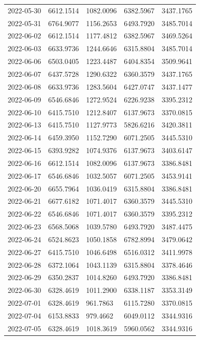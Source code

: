 \begin{footnotesize}
\begin{longtable}{lllll}
2022-05-30 & 6612.1514 & 1082.0096 & 6382.5967 & 3437.1765 \\
2022-05-31 & 6764.9077 & 1156.2653 & 6493.7920 & 3485.7014 \\
2022-06-02 & 6612.1514 & 1177.4812 & 6382.5967 & 3469.5264 \\
2022-06-03 & 6633.9736 & 1244.6646 & 6315.8804 & 3485.7014 \\
2022-06-06 & 6503.0405 & 1223.4487 & 6404.8354 & 3509.9641 \\
2022-06-07 & 6437.5728 & 1290.6322 & 6360.3579 & 3437.1765 \\
2022-06-08 & 6633.9736 & 1283.5604 & 6427.0747 & 3437.1477 \\
2022-06-09 & 6546.6846 & 1272.9524 & 6226.9238 & 3395.2312 \\
2022-06-10 & 6415.7510 & 1212.8407 & 6137.9673 & 3370.0815 \\
2022-06-13 & 6415.7510 & 1127.9773 & 5826.6216 & 3420.3811 \\
2022-06-14 & 6459.3950 & 1152.7290 & 6071.2505 & 3445.5310 \\
2022-06-15 & 6393.9282 & 1074.9376 & 6137.9673 & 3403.6147 \\
2022-06-16 & 6612.1514 & 1082.0096 & 6137.9673 & 3386.8481 \\
2022-06-17 & 6546.6846 & 1032.5057 & 6071.2505 & 3453.9141 \\
2022-06-20 & 6655.7964 & 1036.0419 & 6315.8804 & 3386.8481 \\
2022-06-21 & 6677.6182 & 1071.4017 & 6360.3579 & 3445.5310 \\
2022-06-22 & 6546.6846 & 1071.4017 & 6360.3579 & 3395.2312 \\
2022-06-23 & 6568.5068 & 1039.5780 & 6493.7920 & 3487.4475 \\
2022-06-24 & 6524.8623 & 1050.1858 & 6782.8994 & 3479.0642 \\
2022-06-27 & 6415.7510 & 1046.6498 & 6516.0312 & 3411.9978 \\
2022-06-28 & 6372.1064 & 1043.1139 & 6315.8804 & 3378.4646 \\
2022-06-29 & 6350.2837 & 1014.8260 & 6493.7920 & 3386.8481 \\
2022-06-30 & 6328.4619 & 1011.2900 & 6338.1187 & 3353.3149 \\
2022-07-01 & 6328.4619 & 961.7863 & 6115.7280 & 3370.0815 \\
2022-07-04 & 6153.8833 & 979.4662 & 6049.0112 & 3344.9316 \\
2022-07-05 & 6328.4619 & 1018.3619 & 5960.0562 & 3344.9316 \\

\end{longtable}
\end{footnotesize}
